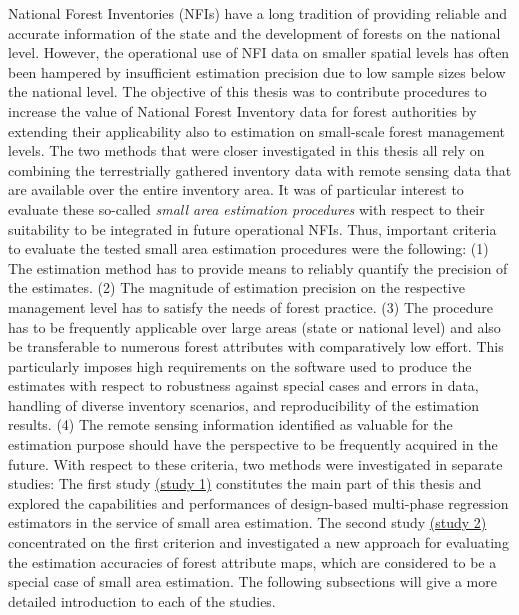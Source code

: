 National Forest Inventories (NFIs) have a long tradition of providing reliable and accurate information of the state and the development of forests on the national level. However, the operational use of NFI data on smaller spatial levels has often been hampered by insufficient estimation precision due to low sample sizes below the national level. The objective of this thesis was to contribute procedures to increase the value of National Forest Inventory data for forest authorities by extending their applicability also to estimation on small-scale forest management levels. The two methods that were closer investigated in this thesis all rely on combining the terrestrially gathered inventory data with remote sensing data that are available over the entire inventory area. It was of particular interest to evaluate these so-called \textit{small area estimation procedures} with respect to their suitability to be integrated in future operational NFIs. Thus, important criteria to evaluate the tested small area estimation procedures were the following: (1) The estimation method has to provide means to reliably quantify the precision of the estimates. (2) The magnitude of estimation precision on the respective management level has to satisfy the needs of forest practice. (3) The procedure has to be frequently applicable over large areas (state or national level) and also be transferable to numerous forest attributes with comparatively low effort. This particularly imposes high requirements on the software used to produce the estimates with respect to robustness against special cases and errors in data, handling of diverse inventory scenarios, and reproducibility of the estimation results. (4) The remote sensing information identified as valuable for the estimation purpose should have the perspective to be frequently acquired in the future. With respect to these criteria, two methods were investigated in separate studies: The first study \hyperref[sec:study1]{(study 1)} constitutes the main part of this thesis and explored the capabilities and performances of design-based multi-phase regression estimators in the service of small area estimation. The second study \hyperref[sec:study2]{(study 2)} concentrated on the first criterion and investigated a new approach for evaluating the estimation accuracies of forest attribute maps, which are considered to be a special case of small area estimation. The following subsections will give a more detailed introduction to each of the studies.


